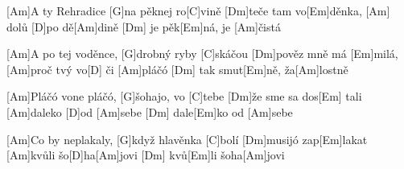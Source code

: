 
[Am]A ty Rehradice [G]na pěknej ro[C]vině
[Dm]teče tam vo[Em]děnka, [Am] dolů [D]po dě[Am]dině
[Dm] je pěk[Em]ná, je [Am]\null čistá

[Am]A po tej voděnce, [G]drobný ryby [C]skáčou
[Dm]pověz mně má [Em]milá, [Am]proč tvý vo[D] \null či [Am]pláčó
[Dm] tak smut[Em]ně, ža[Am]lostně

[Am]Pláčó vone pláčó, [G]\null šohajo, vo [C]tebe
[Dm]\null že sme sa dos[Em] tali [Am]daleko [D]od [Am]sebe
[Dm] dale[Em]ko od [Am]sebe

[Am]Co by neplakaly, [G]když hlavěnka [C]bolí
[Dm]musijó zap[Em]lakat [Am]kvůli šo[D]ha[Am]jovi
[Dm] kvů[Em]li šoha[Am]jovi